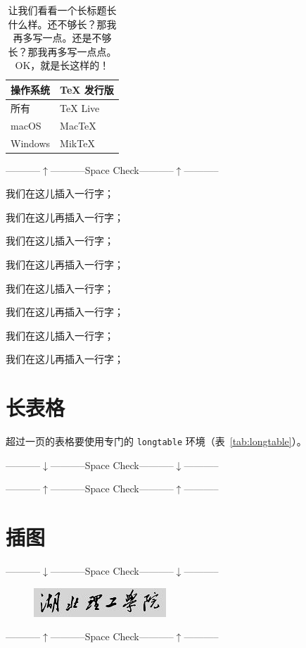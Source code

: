 \begin{table}[!h]
  \centering
  \caption{让我们看看一个长标题长什么样。还不够长？那我再多写一点。还是不够长？那我再多写一点点。OK，就是长这样的！}
  \label{tab:exampletable}
  \begin{tabular}{p{4cm}p{4cm}}
    \toprule
    \multicolumn{1}{c}{\textbf{操作系统}} & \multicolumn{1}{c}{\textbf{TeX 发行版}} \\
    \midrule
    所有 & TeX Live \\
    macOS & MacTeX \\
    Windows & MikTeX \\
    \bottomrule
  \end{tabular}
\end{table}

\centerline{-----------$\uparrow$-----------Space Check-----------$\uparrow$-----------}

我们在这儿插入一行字；

我们在这儿再插入一行字；

我们在这儿插入一行字；

我们在这儿再插入一行字；

我们在这儿插入一行字；

我们在这儿再插入一行字；

我们在这儿插入一行字；

我们在这儿再插入一行字；

\section{长表格}

超过一页的表格要使用专门的 \texttt{longtable} 环境（表~\ref{tab:longtable}）。\\
\centerline{-----------$\downarrow$-----------Space Check-----------$\downarrow$-----------}




\centerline{-----------$\uparrow$-----------Space Check-----------$\uparrow$-----------}


\section{插图}

\centerline{-----------$\downarrow$-----------Space Check-----------$\downarrow$-----------}
\begin{figure}[!h]
  \centering
  \includegraphics[width=.5\textwidth]{pic/logohbpu.png}
  \label{fig:logo}
\end{figure}
\centerline{-----------$\uparrow$-----------Space Check-----------$\uparrow$-----------}

